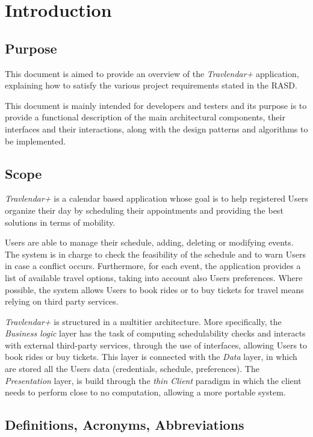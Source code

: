 \section{Introduction}
\subsection{Purpose}
This document is aimed to provide an overview of the \textit{Travlendar+} application, explaining how to satisfy the various project requirements stated in the RASD.

This document is mainly intended for developers and testers and its purpose is to provide a functional description of the main architectural components, their interfaces and their interactions, along with the design patterns and algorithms to be implemented.
 
\subsection{Scope}

\textit{Travlendar+} is a calendar based application whose goal is to help registered Users organize their day by scheduling their appointments and providing the best solutions in terms of mobility.

Users are able to manage their schedule, adding, deleting or modifying events.
The system is in charge to check the feasibility of the schedule and to warn Users in case a conflict occurs. Furthermore, for each event, the application provides a list of available travel options, taking into account also Users preferences. Where possible, the system allows Users to book rides or to buy tickets for travel means relying on third party services. 

\textit{Travlendar+} is structured in a multitier architecture. More specifically, the \textit{Business logic} layer has the task of computing schedulability checks and interacts with external third-party services, through the use of interfaces, allowing Users to book rides or buy tickets. This layer is connected with the \textit{Data} layer, in which are stored all the Users data (credentials, schedule, preferences). The \textit{Presentation} layer, is build through the \textit{thin Client} paradigm in which the client needs to perform close to no computation, allowing a more portable system.

\subsection{Definitions, Acronyms, Abbreviations}

